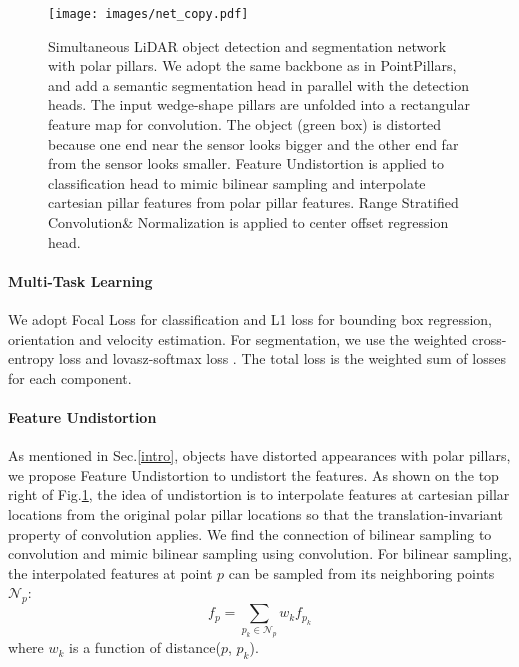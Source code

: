 \documentclass{article}
\begin{document}
\begin{figure}
  \centering 
\texttt{[image: images/net\_copy.pdf]}
  \caption{Simultaneous LiDAR object detection and segmentation network with polar pillars. We adopt the same backbone as in PointPillars\cite{lang2019pointpillars}, and add a semantic segmentation head in parallel with the detection heads. The input wedge-shape pillars are unfolded into a rectangular feature map for convolution. The object (green box) is distorted because one end near the sensor looks bigger and the other end far from the sensor looks smaller. Feature Undistortion is applied to classification head to mimic bilinear sampling and interpolate cartesian pillar features from polar pillar features. Range Stratified Convolution\& Normalization is applied to center offset regression head. }\label{fig:net}
\end{figure}

\vspace{-3.5mm}\paragraph{Multi-Task Learning}

We adopt Focal Loss \cite{lin2017focal} for classification and L1 loss for bounding box regression, orientation and velocity estimation. For segmentation, we use the weighted cross-entropy loss and lovasz-softmax loss \cite{berman2018lovasz}. The total loss is the weighted sum of losses for each component. 

\vspace{-3.5mm}\paragraph{Feature Undistortion}\label{undistortion}
As mentioned in Sec.\ref{intro}, objects have distorted appearances with polar pillars, we propose Feature Undistortion to undistort the features. As shown on the top right of Fig.\ref{fig:net}, the idea of undistortion is to interpolate features at cartesian pillar locations from the original polar pillar locations so that the translation-invariant property of convolution applies. We find the connection of bilinear sampling to convolution and mimic bilinear sampling using convolution. For bilinear sampling, the interpolated features at point $p$ can be sampled from its neighboring points $\mathcal{N}_p$:
\vspace{-1.5mm}\begin{equation}\label{bilinear}
    f_p = \sum_{p_k \in \mathcal{N}_p} w_k f_{p_k} 
\end{equation}\vspace{-1.5mm}
where $w_k$ is a function of distance($p$, $p_k$). 
\end{document}
